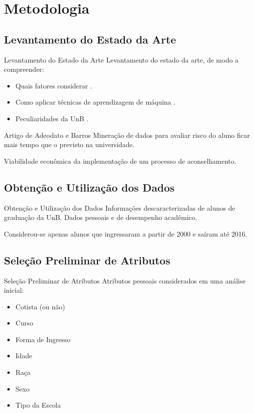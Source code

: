 \section{Metodologia} 
\subsection{Levantamento do Estado da Arte}
\begin{frame}{Levantamento do Estado da Arte}
    Levantamento do estado da arte, de modo a compreender: 
    \begin{itemize}
        \item Quais fatores considerar \cite{dropout_finland}.
        \item Como aplicar técnicas de aprendizagem de máquina \cite{adeodato}.
        \item Peculiaridades da UnB \cite{hoed_fatores}.
    \end{itemize}
\end{frame}

\begin{frame}{Artigo de Adeodato e Barros \cite{adeodato}}
    Mineração de dados para avaliar risco do aluno ficar mais tempo que o previsto na
    universidade.

    \vspace{0.5cm}

    Viabilidade econômica da implementação de um processo de aconselhamento. 
\end{frame}

\subsection{Obtenção e Utilização dos Dados}
\begin{frame}{Obtenção e Utilização dos Dados}
    Informações descaracterizadas de alunos de graduação da UnB. Dados pessoais e de
    desempenho acadêmico. 

    \vspace{0.5cm}

    Considerou-se apenas alunos que ingressaram a partir de 2000 e saíram até 2016.
\end{frame}

\subsection{Seleção Preliminar de Atributos}
\begin{frame}{Seleção Preliminar de Atributos}
    Atributos pessoais considerados em uma análise inicial: 
    \begin{itemize}
        \item Cotista (ou não)
        \item Curso 
        \item Forma de Ingresso
        \item Idade
        \item Raça 
        \item Sexo 
        \item Tipo da Escola
    \end{itemize}
\end{frame}

